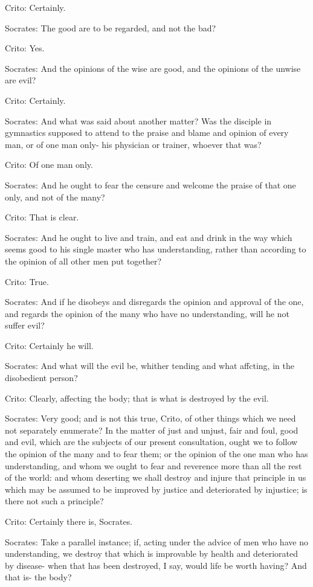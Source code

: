 Crito: Certainly. 

Socrates: The good are to be regarded, and not the bad? 

Crito: Yes. 

Socrates: And the opinions of the wise are good, and the opinions of the
unwise are evil? 

Crito: Certainly. 

Socrates: And what was said about another matter? Was the disciple in gymnastics
supposed to attend to the praise and blame and opinion of every man,
or of one man only- his physician or trainer, whoever that was?

Crito: Of one man only. 

Socrates: And he ought to fear the censure and welcome the praise of that
one only, and not of the many? 

Crito: That is clear. 

Socrates: And he ought to live and train, and eat and drink in the way
which seems good to his single master who has understanding, rather
than according to the opinion of all other men put together?

Crito: True. 

Socrates: And if he disobeys and disregards the opinion and approval of
the one, and regards the opinion of the many who have no understanding,
will he not suffer evil? 

Crito: Certainly he will. 

Socrates: And what will the evil be, whither tending and what affcting,
in the disobedient person? 

Crito: Clearly, affecting the body; that is what is destroyed by the
evil. 

Socrates: Very good; and is not this true, Crito, of other things which
we need not separately enumerate? In the matter of just and unjust,
fair and foul, good and evil, which are the subjects of our present
consultation, ought we to follow the opinion of the many and to fear
them; or the opinion of the one man who has understanding, and whom
we ought to fear and reverence more than all the rest of the world:
and whom deserting we shall destroy and injure that principle in us
which may be assumed to be improved by justice and deteriorated by
injustice; is there not such a principle? 

Crito: Certainly there is, Socrates. 

Socrates: Take a parallel instance; if, acting under the advice of men
who have no understanding, we destroy that which is improvable by
health and deteriorated by disease- when that has been destroyed,
I say, would life be worth having? And that is- the body?

